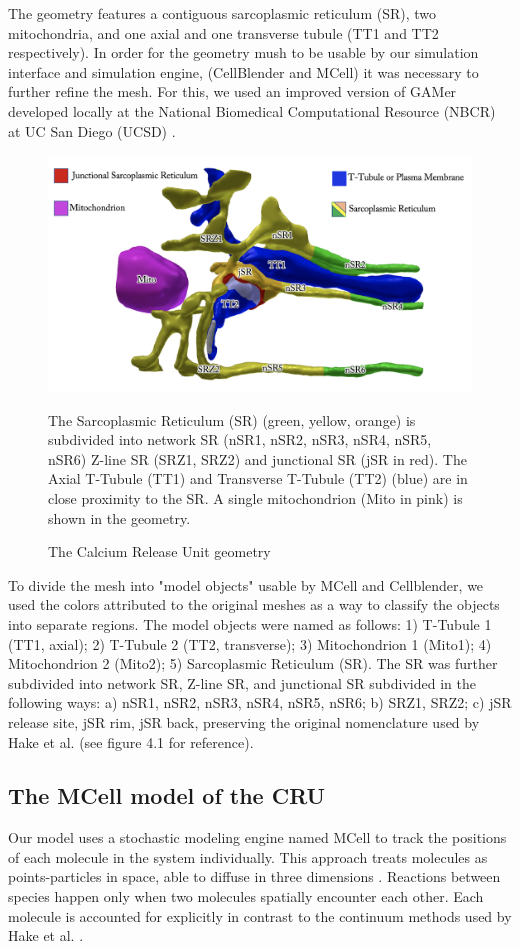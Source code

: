 \documentclass[12pt]{ucsddissertation}
\begin{document}
The geometry features a contiguous sarcoplasmic reticulum (SR), two mitochondria, and one axial and one transverse tubule (TT1 and TT2 respectively). In order for the geometry mush to be usable by our simulation interface and simulation engine, (CellBlender and MCell) it was necessary to further refine the mesh. For this, we used an improved version of GAMer developed locally at the National Biomedical Computational Resource (NBCR) at UC San Diego (UCSD) \cite{Yu2008,Lee2018}.

\begin{figure}
\centering
	\includegraphics[scale=0.25]{CRU_geometry.png}
	\caption{The Calcium Release Unit geometry}
	The Sarcoplasmic Reticulum (SR) (green, yellow, orange) is subdivided into network SR (nSR1, nSR2, nSR3, nSR4, nSR5, nSR6) Z-line SR (SRZ1, SRZ2) and junctional SR (jSR in red). The Axial T-Tubule (TT1) and Transverse T-Tubule (TT2) (blue) are in close proximity to the SR. A single mitochondrion (Mito in pink) is shown in the geometry. 
\label{fig:CRU} 
\end{figure}
 
To divide the mesh into "model objects" usable by MCell and Cellblender, we used the colors attributed to the original meshes as a way to classify the objects into separate regions. The model objects were named as follows: 1) T-Tubule 1 (TT1, axial); 2) T-Tubule 2 (TT2, transverse); 3) Mitochondrion 1 (Mito1); 4) Mitochondrion 2 (Mito2); 5) Sarcoplasmic Reticulum (SR). The SR was further subdivided into network SR, Z-line SR, and junctional SR subdivided in the following ways: a) nSR1, nSR2, nSR3, nSR4, nSR5, nSR6; b) SRZ1, SRZ2; c) jSR release site, jSR rim, jSR back, preserving the original nomenclature used by Hake et al. \cite{Hake2012} (see figure 4.1 for reference).


\subsection{The MCell model of the CRU}
Our model uses a stochastic modeling engine named MCell \cite{Stiles2001a,Kerr2008,Czech2009} to track the positions of each molecule in the system individually. This approach treats molecules as points-particles in space, able to diffuse in three dimensions . Reactions between species happen only when two molecules spatially encounter each other. Each molecule is accounted for explicitly in contrast to the continuum methods used by Hake et al. \cite{Hake2012}. 
\end{document}
